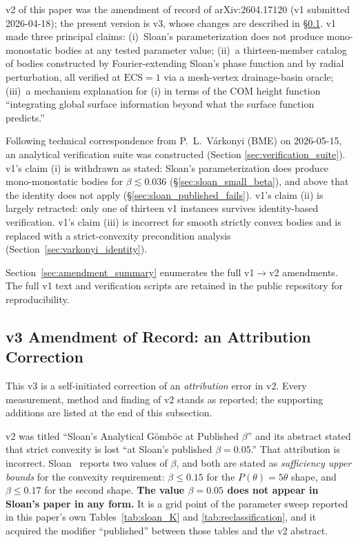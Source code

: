 \documentclass[11pt,a4paper]{article}
\begin{document}
v2 of this paper was the amendment of record of arXiv:2604.17120
(v1 submitted 2026-04-18); the present version is v3, whose changes
are described in \S\ref{sec:v3_amendment}. v1 made three principal claims: (i)~Sloan's
parameterization does not produce mono-monostatic bodies at any
tested parameter value; (ii)~a thirteen-member catalog of bodies
constructed by Fourier-extending Sloan's phase function and by
radial perturbation, all verified at $\mathrm{ECS}=1$ via a
mesh-vertex drainage-basin oracle; (iii)~a mechanism explanation
for (i) in terms of the COM height function ``integrating global
surface information beyond what the surface function predicts.''

Following technical correspondence from P.~L.~V\'arkonyi (BME) on
2026-05-15, an analytical verification suite was constructed (Section
\ref{sec:verification_suite}). v1's claim (i) is withdrawn as stated: Sloan's
parameterization does produce mono-monostatic bodies for
$\beta \lesssim 0.036$ (\S\ref{sec:sloan_small_beta}), and above that
the identity does not apply (\S\ref{sec:sloan_published_fails}). v1's claim (ii) is largely
retracted: only one of thirteen v1 instances survives identity-based
verification. v1's claim (iii) is incorrect for smooth strictly
convex bodies and is replaced with a strict-convexity precondition
analysis (Section~\ref{sec:varkonyi_identity}).

Section~\ref{sec:amendment_summary} enumerates the full v1$\to$v2
amendments. The full v1 text and verification scripts are retained
in the public repository for reproducibility.

\subsection{v3 Amendment of Record: an Attribution Correction}
\label{sec:v3_amendment}

This v3 is a self-initiated correction of an \emph{attribution}
error in v2. Every measurement, method and finding of v2 stands as
reported; the supporting additions are listed at the end of this
subsection.

v2 was titled ``Sloan's Analytical G\"omb\"oc at Published $\beta$''
and its abstract stated that strict convexity is lost ``at Sloan's
published $\beta = 0.05$.'' That attribution is incorrect.
Sloan~\cite{sloan2023} reports two values of $\beta$, and both are
stated as \emph{sufficiency upper bounds} for the convexity
requirement: $\beta \le 0.15$ for the $P(\theta) = 5\theta$ shape,
and $\beta \le 0.17$ for the second shape. \textbf{The value
$\beta = 0.05$ does not appear in Sloan's paper in any form.} It is
a grid point of the parameter sweep reported in this paper's own
Tables~\ref{tab:sloan_K} and \ref{tab:reclassification}, and it
acquired the modifier ``published'' between those tables and the
v2 abstract.
\end{document}
